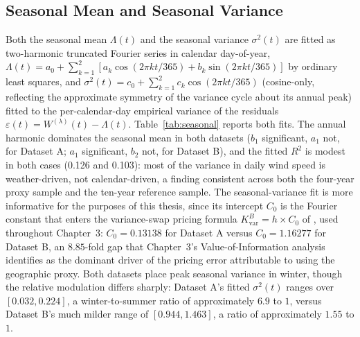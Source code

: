 \documentclass[11pt, a4paper, twoside]{article}
\begin{document}
\subsection{Seasonal Mean and Seasonal Variance}
\label{sec:phase1-seasonal}

Both the seasonal mean $\Lambda(t)$ and the seasonal variance $\sigma^2(t)$ are fitted as two-harmonic truncated Fourier series in calendar day-of-year, $\Lambda(t) = a_0 + \sum_{k=1}^2 [a_k \cos(2\pi k t/365) + b_k \sin(2\pi k t /365)]$ by ordinary least squares, and $\sigma^2(t) = c_0 + \sum_{k=1}^2 c_k \cos(2\pi k t/365)$ (cosine-only, reflecting the approximate symmetry of the variance cycle about its annual peak) fitted to the per-calendar-day empirical variance of the residuals $\varepsilon(t) = W^{(\lambda)}(t) - \Lambda(t)$. Table~\ref{tab:seasonal} reports both fits. The annual harmonic dominates the seasonal mean in both datasets ($b_1$ significant, $a_1$ not, for Dataset A; $a_1$ significant, $b_2$ not, for Dataset B), and the fitted $R^2$ is modest in both cases (0.126 and 0.103): most of the variance in daily wind speed is weather-driven, not calendar-driven, a finding consistent across both the four-year proxy sample and the ten-year reference sample. The seasonal-variance fit is more informative for the purposes of this thesis, since its intercept $C_0$ is the Fourier constant that enters the variance-swap pricing formula $K_{\text{var}}^B = h \times C_0$ of \citet{Tol1997}, used throughout Chapter~3: $C_0 = 0.13138$ for Dataset A versus $C_0 = 1.16277$ for Dataset B, an $8.85$-fold gap that Chapter~3's Value-of-Information analysis identifies as the dominant driver of the pricing error attributable to using the geographic proxy. Both datasets place peak seasonal variance in winter, though the relative modulation differs sharply: Dataset A's fitted $\sigma^2(t)$ ranges over $[0.032, 0.224]$, a winter-to-summer ratio of approximately $6.9$ to $1$, versus Dataset B's much milder range of $[0.944, 1.463]$, a ratio of approximately $1.55$ to $1$.
\end{document}
